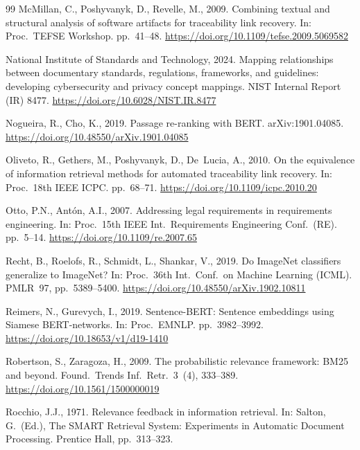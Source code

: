 \documentclass[smallextended,natbib]{svjour3}
\begin{document}
\begin{thebibliography}{99}
McMillan, C., Poshyvanyk, D., Revelle, M., 2009. Combining textual and structural analysis of software artifacts for traceability link recovery. In: Proc.\ TEFSE Workshop. pp.\ 41--48. \url{https://doi.org/10.1109/tefse.2009.5069582}

National Institute of Standards and Technology, 2024. Mapping relationships between documentary standards, regulations, frameworks, and guidelines: developing cybersecurity and privacy concept mappings. NIST Internal Report (IR) 8477. \url{https://doi.org/10.6028/NIST.IR.8477}

Nogueira, R., Cho, K., 2019. Passage re-ranking with BERT. arXiv:1901.04085. \url{https://doi.org/10.48550/arXiv.1901.04085}

Oliveto, R., Gethers, M., Poshyvanyk, D., De~Lucia, A., 2010. On the equivalence of information retrieval methods for automated traceability link recovery. In: Proc.\ 18th IEEE ICPC. pp.\ 68--71. \url{https://doi.org/10.1109/icpc.2010.20}

Otto, P.N., Ant\'on, A.I., 2007. Addressing legal requirements in requirements engineering. In: Proc.\ 15th IEEE Int.\ Requirements Engineering Conf.\ (RE). pp.\ 5--14. \url{https://doi.org/10.1109/re.2007.65}

Recht, B., Roelofs, R., Schmidt, L., Shankar, V., 2019. Do ImageNet classifiers generalize to ImageNet? In: Proc.\ 36th Int.\ Conf.\ on Machine Learning (ICML). PMLR~97, pp.\ 5389--5400. \url{https://doi.org/10.48550/arXiv.1902.10811}

Reimers, N., Gurevych, I., 2019. Sentence-BERT: Sentence embeddings using Siamese BERT-networks. In: Proc.\ EMNLP. pp.\ 3982--3992. \url{https://doi.org/10.18653/v1/d19-1410}

Robertson, S., Zaragoza, H., 2009. The probabilistic relevance framework: BM25 and beyond. Found.\ Trends Inf.\ Retr.\ 3~(4), 333--389. \url{https://doi.org/10.1561/1500000019}

Rocchio, J.J., 1971. Relevance feedback in information retrieval. In: Salton, G.\ (Ed.), The SMART Retrieval System: Experiments in Automatic Document Processing. Prentice Hall, pp.\ 313--323.


\end{thebibliography}
\end{document}

